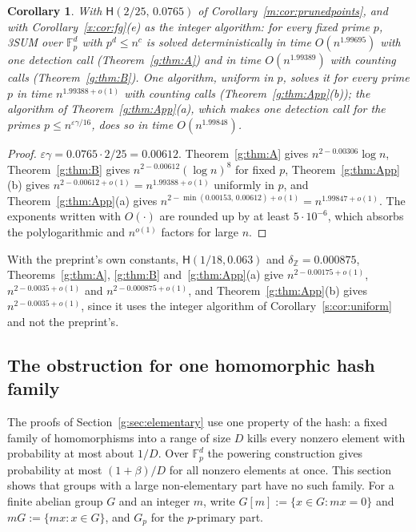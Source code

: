 \documentclass[11pt]{article}
\newtheorem{corollary}[theorem]{Corollary}
\theoremstyle{definition}
\theoremstyle{remark}
\newcommand{\Z}{\mathbb{Z}}
\newcommand{\Fp}{\mathbb{F}_p}
\newcommand{\eps}{\varepsilon}
\newcommand{\Hyp}{\mathsf{H}}
\newcommand{\EpsGammaBest}{0.00612}%
\newcommand{\ExpThreeSumBest}{1.99388}%
\newcommand{\HypPrunedEps}{2/25}%
\newcommand{\HypPrunedGamma}{0.0765}%
\newcommand{\EpsGammaBestHalf}{0.00306}%
\newcommand{\EpsGammaBestQuarter}{0.00153}%
\newcommand{\ExpBestUp}{1.99389}%
\newcommand{\ExpHalfBestUp}{1.99695}%
\newcommand{\ExpQuarterBest}{1.99847}%
\newcommand{\ExpQuarterBestUp}{1.99848}%
\begin{document}
\begin{corollary}\label{g:cor:explicitA}
With $\Hyp(\HypPrunedEps,\,\HypPrunedGamma)$ of Corollary~\ref{m:cor:prunedpoints}, and with Corollary~\ref{x:cor:fg}(e) as the integer algorithm: for every fixed prime $p$, 3SUM over $\Fp^d$ with $p^d\le n^c$ is solved deterministically in time $O(n^{\ExpHalfBestUp})$ with one detection call (Theorem~\ref{g:thm:A}) and in time $O(n^{\ExpBestUp})$ with counting calls (Theorem~\ref{g:thm:B}). One algorithm, uniform in $p$, solves it for every prime $p$ in time $n^{\ExpThreeSumBest+o(1)}$ with counting calls (Theorem~\ref{g:thm:App}(b)); the algorithm of Theorem~\ref{g:thm:App}(a), which makes one detection call for the primes $p\le n^{\eps\gamma/16}$, does so in time $O(n^{\ExpQuarterBestUp})$.
\end{corollary}
\begin{proof}
$\eps\gamma=\HypPrunedGamma\cdot\HypPrunedEps=\EpsGammaBest$. Theorem~\ref{g:thm:A} gives $n^{2-\EpsGammaBestHalf}\log n$, Theorem~\ref{g:thm:B} gives $n^{2-\EpsGammaBest}(\log n)^8$ for fixed $p$, Theorem~\ref{g:thm:App}(b) gives $n^{2-\EpsGammaBest+o(1)}=n^{\ExpThreeSumBest+o(1)}$ uniformly in $p$, and Theorem~\ref{g:thm:App}(a) gives $n^{2-\min(\EpsGammaBestQuarter,\,\EpsGammaBest)+o(1)}=n^{\ExpQuarterBest+o(1)}$. The exponents written with $O(\cdot)$ are rounded up by at least $5\cdot10^{-6}$, which absorbs the polylogarithmic and $n^{o(1)}$ factors for large $n$.
\end{proof}

With the preprint's own constants, $\Hyp(1/18,0.063)$ and $\delta_\Z=0.000875$, Theorems~\ref{g:thm:A}, \ref{g:thm:B} and~\ref{g:thm:App}(a) give $n^{2-0.00175+o(1)}$, $n^{2-0.0035+o(1)}$ and $n^{2-0.000875+o(1)}$, and Theorem~\ref{g:thm:App}(b) gives $n^{2-0.0035+o(1)}$, since it uses the integer algorithm of Corollary~\ref{s:cor:uniform} and not the preprint's.

\subsection{The obstruction for one homomorphic hash family}\label{g:sec:obstruction}

The proofs of Section~\ref{g:sec:elementary} use one property of the hash: a fixed family of homomorphisms into a range of size $D$ kills every nonzero element with probability at most about $1/D$. Over $\Fp^d$ the powering construction gives probability at most $(1+\beta)/D$ for all nonzero elements at once. This section shows that groups with a large non-elementary part have no such family. For a finite abelian group $G$ and an integer $m$, write $G[m]:=\{x\in G:mx=0\}$ and $mG:=\{mx:x\in G\}$, and $G_p$ for the $p$-primary part.
\end{document}
